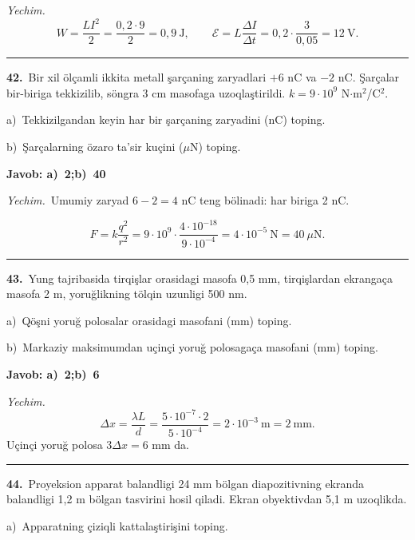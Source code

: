 \documentclass[11pt,a4paper]{article}
\begin{document}
\noindent\textit{Yechim.}\ \[W=\frac{LI^2}{2}=\frac{0{,}2\cdot9}{2}=0{,}9\ \text{J},\qquad \mathcal E=L\frac{\Delta I}{\Delta t}=0{,}2\cdot\frac{3}{0{,}05}=12\ \text{V}.\]\par\medskip\hrule\medskip
{}\noindent\textbf{42.}\ Bir xil ölçamli ikkita metall şarçaning zaryadlari $+6$ nC va $-2$ nC. Şarçalar bir-biriga tekkizilib, söngra 3 cm masofaga uzoqlaştirildi. $k=9\cdot10^9$ N$\cdot$m$^2$/C$^2$.\par
\noindent\hspace*{4mm}a)\ Tekkizilgandan keyin har bir şarçaning zaryadini (nC) toping.\par
\noindent\hspace*{4mm}b)\ Şarçalarning özaro ta’sir kuçini ($\mu$N) toping.\par
\noindent\colorbox{gray!12}{\parbox{\dimexpr\linewidth-2\fboxsep}{\textbf{Javob: a)\ 2;\quad b)\ 40}}}\par\smallskip
\noindent\textit{Yechim.}\ Umumiy zaryad $6-2=4$ nC teng bölinadi: har biriga 2 nC.\par
\[F=k\frac{q^2}{r^2}=9\cdot10^9\cdot\frac{4\cdot10^{-18}}{9\cdot10^{-4}}=4\cdot10^{-5}\ \text{N}=40\ \mu\text{N}.\]\par\medskip\hrule\medskip
{}\noindent\textbf{43.}\ Yung tajribasida tirqişlar orasidagi masofa 0,5 mm, tirqişlardan ekrangaça masofa 2 m, yoruğlikning tölqin uzunligi 500 nm.\par
\noindent\hspace*{4mm}a)\ Qöşni yoruğ polosalar orasidagi masofani (mm) toping.\par
\noindent\hspace*{4mm}b)\ Markaziy maksimumdan uçinçi yoruğ polosagaça masofani (mm) toping.\par
\noindent\colorbox{gray!12}{\parbox{\dimexpr\linewidth-2\fboxsep}{\textbf{Javob: a)\ 2;\quad b)\ 6}}}\par\smallskip
\noindent\textit{Yechim.}\ \[\Delta x=\frac{\lambda L}{d}=\frac{5\cdot10^{-7}\cdot2}{5\cdot10^{-4}}=2\cdot10^{-3}\ \text{m}=2\ \text{mm}.\]
Uçinçi yoruğ polosa $3\Delta x=6$ mm da.\par\par\medskip\hrule\medskip
{}\noindent\textbf{44.}\ Proyeksion apparat balandligi 24 mm bölgan diapozitivning ekranda balandligi 1,2 m bölgan tasvirini hosil qiladi. Ekran obyektivdan 5,1 m uzoqlikda.\par
\noindent\hspace*{4mm}a)\ Apparatning çiziqli kattalaştirişini toping.\par
\end{document}
